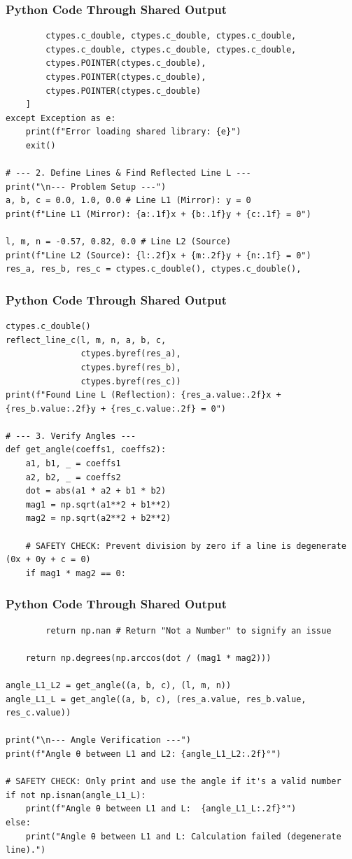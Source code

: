 \documentclass{beamer}
\begin{document}
\begin{frame}[fragile]
\frametitle{Python Code Through Shared Output}
\begin{lstlisting}
        ctypes.c_double, ctypes.c_double, ctypes.c_double,
        ctypes.c_double, ctypes.c_double, ctypes.c_double,
        ctypes.POINTER(ctypes.c_double),
        ctypes.POINTER(ctypes.c_double),
        ctypes.POINTER(ctypes.c_double)
    ]
except Exception as e:
    print(f"Error loading shared library: {e}")
    exit()

# --- 2. Define Lines & Find Reflected Line L ---
print("\n--- Problem Setup ---")
a, b, c = 0.0, 1.0, 0.0 # Line L1 (Mirror): y = 0
print(f"Line L1 (Mirror): {a:.1f}x + {b:.1f}y + {c:.1f} = 0")

l, m, n = -0.57, 0.82, 0.0 # Line L2 (Source)
print(f"Line L2 (Source): {l:.2f}x + {m:.2f}y + {n:.1f} = 0")
res_a, res_b, res_c = ctypes.c_double(), ctypes.c_double(), 
\end{lstlisting}
\end{frame}
\begin{frame}[fragile]
\frametitle{Python Code Through Shared Output}
\begin{lstlisting}
ctypes.c_double()
reflect_line_c(l, m, n, a, b, c,
               ctypes.byref(res_a),
               ctypes.byref(res_b),
               ctypes.byref(res_c))
print(f"Found Line L (Reflection): {res_a.value:.2f}x + {res_b.value:.2f}y + {res_c.value:.2f} = 0")

# --- 3. Verify Angles ---
def get_angle(coeffs1, coeffs2):
    a1, b1, _ = coeffs1
    a2, b2, _ = coeffs2
    dot = abs(a1 * a2 + b1 * b2)
    mag1 = np.sqrt(a1**2 + b1**2)
    mag2 = np.sqrt(a2**2 + b2**2)
    
    # SAFETY CHECK: Prevent division by zero if a line is degenerate (0x + 0y + c = 0)
    if mag1 * mag2 == 0:
    \end{lstlisting}
\end{frame}
\begin{frame}[fragile]
\frametitle{Python Code Through Shared Output}
\begin{lstlisting}
        return np.nan # Return "Not a Number" to signify an issue
    
    return np.degrees(np.arccos(dot / (mag1 * mag2)))

angle_L1_L2 = get_angle((a, b, c), (l, m, n))
angle_L1_L = get_angle((a, b, c), (res_a.value, res_b.value, res_c.value))

print("\n--- Angle Verification ---")
print(f"Angle θ between L1 and L2: {angle_L1_L2:.2f}°")

# SAFETY CHECK: Only print and use the angle if it's a valid number
if not np.isnan(angle_L1_L):
    print(f"Angle θ between L1 and L:  {angle_L1_L:.2f}°")
else:
    print("Angle θ between L1 and L: Calculation failed (degenerate line).")
\end{lstlisting}
\end{frame}
\end{document}
